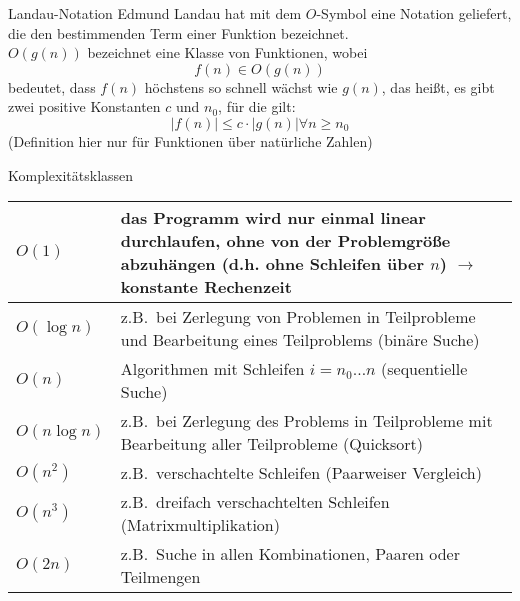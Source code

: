\begin{defi}{Landau-Notation}
    Edmund Landau hat mit dem $O$-Symbol eine Notation geliefert,
    die den bestimmenden Term einer Funktion bezeichnet. \\
    $O(g(n))$ bezeichnet eine Klasse von Funktionen, wobei
    \[f(n) \in O(g(n))\]
    bedeutet, dass $f(n)$ höchstens so schnell wächst wie $g(n)$,
    das heißt, es gibt zwei positive Konstanten $c$ und $n_0$,
    für die gilt:
    \[|f(n)| \leq c \cdot |g(n)| \forall n \geq n_0\]
    (Definition hier nur für Funktionen über natürliche Zahlen)
\end{defi}

\begin{example}{Komplexitätsklassen}
    \begin{tabularx}{\textwidth}{|l|X|}
        \hline
        $O(1)$        & das Programm wird nur einmal linear durchlaufen, ohne von der Problemgröße abzuhängen (d.h. ohne Schleifen über $n$) $\to$ konstante Rechenzeit \\
        \hline
        $O(\log n)$   & z.B.\ bei Zerlegung von Problemen in Teilprobleme und Bearbeitung eines Teilproblems (binäre Suche)                                             \\
        \hline
        $O(n)$        & Algorithmen mit Schleifen $i = n_0 \ldots n$ (sequentielle Suche)                                                                               \\
        \hline
        $O(n \log n)$ & z.B.\ bei Zerlegung des Problems in Teilprobleme mit Bearbeitung aller Teilprobleme (Quicksort)                                                 \\
        \hline
        $O(n^2)$      & z.B.\ verschachtelte Schleifen (Paarweiser Vergleich)                                                                                           \\
        \hline
        $O(n^3)$      & z.B.\ dreifach verschachtelten Schleifen (Matrixmultiplikation)                                                                                 \\
        \hline
        $O(2n)$       & z.B.\ Suche in allen Kombinationen, Paaren oder Teilmengen                                                                                      \\
        \hline
    \end{tabularx}
\end{example}



